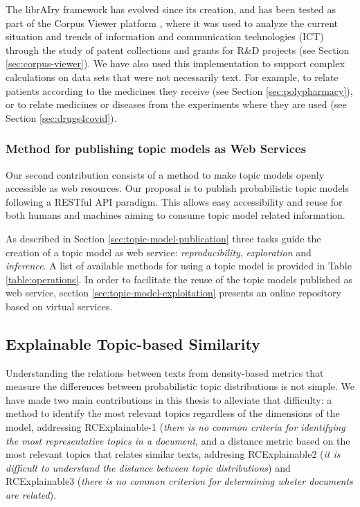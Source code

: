 The librAIry framework has evolved since its creation, and has been tested as part of the Corpus Viewer platform \citep{Samy2019}, where it was used to analyze the current situation and trends of information and communication technologies (ICT) through the study of patent collections and grants for R\&D projects (see Section \ref{sec:corpus-viewer}). We have also used this implementation to support complex calculations on data sets that were not necessarily text. For example, to relate patients according to the medicines they receive \citep{Badenes-Olmedo2019c} (see Section 	\ref{sec:polypharmacy}), or to relate medicines or diseases from the experiments where they are used (see Section \ref{sec:drugs4covid}).

\subsubsection{Method for publishing topic models as Web Services}

Our second contribution consists of a method to make topic models openly accessible as web resources. Our proposal is to publish probabilistic topic models following a RESTful API paradigm. This allows easy accessibility and reuse for both humans and machines aiming to consume topic model related information.

As described in Section \ref{sec:topic-model-publication} three tasks guide the creation of a topic model as web service: \textit{reproducibility}, \textit{exploration} and \textit{inference}. A list of available methods for using a topic model is provided in Table \ref{table:operations}. In order to facilitate the reuse of the topic models published as web service, section \ref{sec:topic-model-exploitation} presents an online repository based on virtual services.

\subsection{Explainable Topic-based Similarity}

Understanding the relations between texts from density-based metrics that measure the differences between probabilistic topic distributions is not simple. We have made two main contributions in this thesis to alleviate that difficulty: a method to identify the most relevant topics regardless of the dimensions of the model, addressing RCExplainable-1 (\textit{there is no common criteria for identifying the most representative topics in a document}, and a distance metric based on the most relevant topics that relates similar texts, addresing RCExplainable2 (\textit{it is difficult to understand the distance between topic distributions}) and RCExplainable3 (\textit{there is no common criterion for determining wheter documents are related}).

